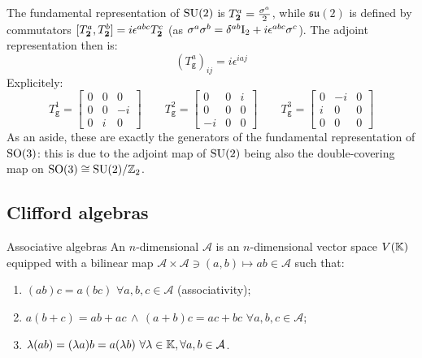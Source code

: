 The fundamental representation of $ \mathrm{SU}(2) $ is $ T^a_{\mathbf{2}} = \frac{\sigma^a}{2} $, while $ \mathfrak{su}(2) $ is defined by commutators $ [T^a_{\mathbf{2}},T^b_{\mathbf{2}}] = i \epsilon^{abc} T^c_{\mathbf{2}} $ (as $ \sigma^a \sigma^b = \delta^{ab} \mathrm{I}_2 + i \epsilon^{abc} \sigma^c $). The adjoint representation then is:
\begin{equation}
  (T^a_\mathtt{g})_{ij} = i \epsilon^{iaj}
\end{equation}
Explicitely:
\begin{equation*}
  T^1_\mathtt{g} =
  \begin{bmatrix}
    0 & 0 & 0 \\
    0 & 0 & -i \\
    0 & i & 0
  \end{bmatrix}
  \qquad
  T^2_\mathtt{g} =
  \begin{bmatrix}
    0 & 0 & i \\
    0 & 0 & 0 \\
    -i & 0 & 0
  \end{bmatrix}
  \qquad
  T^3_\mathtt{g} =
  \begin{bmatrix}
    0 & -i & 0 \\
    i & 0 & 0 \\
    0 & 0 & 0
  \end{bmatrix}
\end{equation*}
As an aside, these are exactly the generators of the fundamental representation of $ \mathrm{SO}(3) $: this is due to the adjoint map of $ \mathrm{SU}(2) $ being also the double-covering map on $ \mathrm{SO}(3) \cong \mathrm{SU}(2) / \mathbb{Z}_2 $.

\subsection{Clifford algebras}

\begin{definition}{Associative algebras}{}
  An $ n $-dimensional  $ \mathcal{A} $ is an $ n $-dimensional vector space $ V(\mathbb{K}) $ equipped with a bilinear map $ \mathcal{A} \times \mathcal{A} \ni (a,b) \mapsto ab \in \mathcal{A} $ such that:
  \begin{enumerate}
    \item $ (ab)c = a(bc) \,\,\forall a,b,c \in \mathcal{A} $ (associativity);
    \item $ a(b + c) = ab + ac \,\land\, (a + b)c = ac + bc \,\,\forall a,b,c \in \mathcal{A} $;
    \item $ \lambda (ab) = (\lambda a)b = a(\lambda b) \,\,\forall \lambda \in \mathbb{K}, \forall a,b \in \mathcal{A} $.
  \end{enumerate}
\end{definition}


